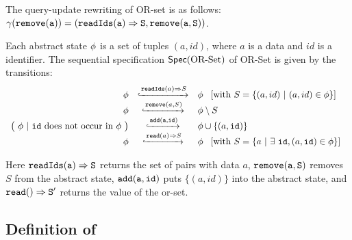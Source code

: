 \begin{example}
\label{definition:sequential specification of or-set}
The query-update rewriting of OR-set is as follows: $\gamma( \alabelshort[{\tt remove}]{a} ) = ( \alabellong[{\tt readIds}]{a}{S}{}, \alabelshort[{\tt remove}]{a,S})$.


Each abstract state $\phi$ is a set of tuples $(a,id)$, where $a$
is a data and $id$ is a identifier. The sequential specification
$\mathsf{Spec}(\text{OR\text{-}Set})$ of OR-Set is given by the transitions:
\[
  \begin{array}{rcl}
    \abstate
    & \specarrow{\alabellong[\mathtt{readIds}]{a}{S}{}}
    & \abstate\
      \begin{array}{c}
        [\text{with}\ S = \{ (a,id)\ \vert\ (a,id) \in \abstate\}]
      \end{array}\\
    \abstate &
               \specarrow{\alabelshort[\mathtt{remove}]{a,S}}
    & \abstate \setminus S \\
    \big(\ \abstate\ |\ \mathtt{id}\ \text{does not occur in } \abstate\ \big)
             & \specarrow{ \alabelshort[{\tt add}]{a,id} }
    & \abstate \cup \{ (a,\mathtt{id}) \}\\
    \abstate
    & \specarrow{\alabellong[\mathtt{read}]{a}{ S }{}}
    & \abstate\
      \begin{array}{c}
        [\text{with}\ S = \{ a\ \vert\ \exists\ \mathtt{id}, (a,\mathtt{id}) \in \abstate \}]
      \end{array}
  \end{array}
\]

Here $\alabellong[{\tt readIds}]{a}{S}{}$ returns the set of pairs with data $a$, $\alabelshort[{\tt remove}]{a,S}$ removes $S$ from the abstract state, $\alabelshort[{\tt add}]{a,id}$ puts $\{ (a,id) \}$ into the abstract state, and $\alabellong[{\tt read}]{}{S'}{}$ returns the value of the or-set.
\end{example}


\subsection{Definition of \CRDTLin{}}
\label{subsec:definition of distributed linearizability}

